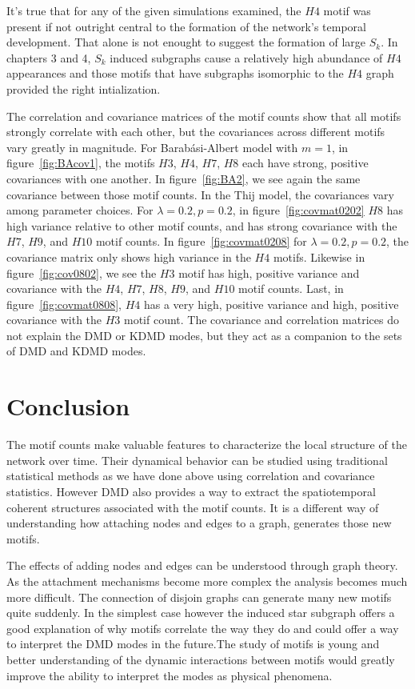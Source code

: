  It's true that for any of the given simulations examined, the $H4$ motif was present if not outright
central to the formation of the network's temporal development. That alone is not enought to
suggest the formation of large $S_k$. In chapters 3 and 4, $S_k$ induced subgraphs cause 
a relatively high abundance of $H4$ appearances and those motifs that have subgraphs isomorphic to
the $H4$ graph provided the right intialization.

The correlation and covariance matrices of the motif counts show that all motifs strongly correlate with each other, but
 the covariances across different motifs vary greatly in magnitude. For Barabási-Albert model with $m=1$, in figure~\ref{fig:BAcov1}, 
 the motifs $H3$, $H4$, $H7$, $H8$ each have strong, positive covariances with one another. In figure~\ref{fig:BA2}, we see again the 
 same covariance between those motif counts. In the Thij model, the covariances vary among parameter choices. For $\lambda=0.2, p=0.2$, in 
 figure~\ref{fig:covmat0202} $H8$ has high variance relative to other motif counts, and has strong covariance with the $H7$, $H9$, and $H10$ motif counts. 
In figure~\ref{fig:covmat0208} for  $\lambda=0.2, p=0.2$, the covariance matrix only shows high variance in the $H4$ motifs. Likewise in figure~\ref{fig:cov0802},
we see the $H3$ motif has high, positive variance and covariance with the $H4$, $H7$, $H8$, $H9$, and $H10$ motif counts. Last, in figure~\ref{fig:covmat0808},
$H4$ has a very high, positive variance and high, positive covariance with the $H3$ motif count. 
The covariance and correlation matrices do not explain the DMD or KDMD modes, but they act as a companion to the sets of DMD and KDMD modes. 


\chapter{Conclusion}

The motif counts make valuable features to characterize the local structure 
of the network over time. Their dynamical behavior can be studied using
traditional statistical methods as we have done above using correlation
and covariance statistics. However DMD also provides a way to extract 
the spatiotemporal coherent structures associated with the motif counts. It 
is a different way of understanding how attaching nodes and edges to a graph,
generates those new motifs. 

The effects of adding nodes and edges can be understood through graph theory. As
the attachment mechanisms become more complex the analysis becomes much more
difficult. The connection of disjoin graphs can generate many new motifs quite
suddenly. In the simplest case however the induced star subgraph offers 
a good explanation of why motifs correlate the way they do and could 
offer a way to interpret the DMD modes in the future.The study 
of motifs is young and better understanding of the dynamic interactions 
between motifs would greatly improve the ability to interpret the modes as physical
phenomena. 

